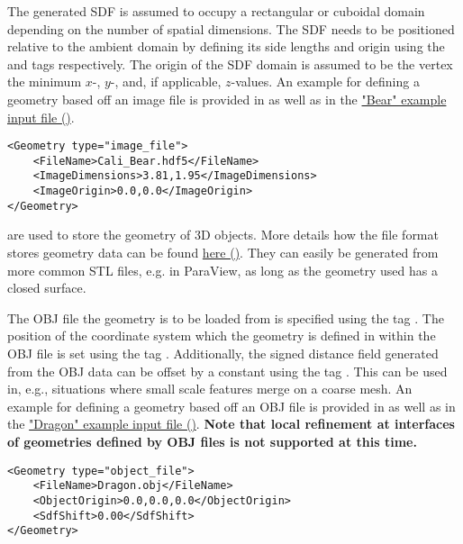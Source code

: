 The generated SDF is assumed to occupy a rectangular or cuboidal domain depending on the number of spatial dimensions. The SDF needs to be positioned relative to the ambient domain by defining its side lengths and origin using the  and  tags respectively. The origin of the SDF domain is assumed to be the vertex the minimum $x$-, $y$-, and, if applicable, $z$-values. An example for defining a geometry based off an image file is provided in  as well as in the \href{https://github.com/kkmaute/moris/blob/main/share/doc/mesh_generation/examples/Bear_Example.xml}{"Bear" example input file (\ExternalLink)}.

\begin{minipage}{\linewidth}
\vspace{0.5cm}
\begin{lstlisting}[caption={Example parameters for an image file as provided in one of the examples.},captionpos=b, label={lst:image}]
<Geometry type="image_file"> 
    <FileName>Cali_Bear.hdf5</FileName>
    <ImageDimensions>3.81,1.95</ImageDimensions>
    <ImageOrigin>0.0,0.0</ImageOrigin>
</Geometry>
\end{lstlisting}
\end{minipage}

 are used to store the geometry of 3D objects.
More details how the file format stores geometry data can be found \href{https://en.wikipedia.org/wiki/Wavefront_.obj_file}{here (\ExternalLink)}. They can easily be generated from more common STL files, e.g. in ParaView, as long as the geometry used has a closed surface.

The OBJ file the geometry is to be loaded from is specified using the tag . The position of the coordinate system which the geometry is defined in within the OBJ file is set using the tag . Additionally, the signed distance field generated from the OBJ data can be offset by a constant using the tag . This can be used in, e.g., situations where small scale features merge on a coarse mesh.
An example for defining a geometry based off an OBJ file is provided in  as well as in the \href{https://github.com/kkmaute/moris/blob/main/share/doc/mesh_generation/examples/Dragon_Example.xml}{"Dragon" example input file (\ExternalLink)}. \textbf{Note that local refinement at interfaces of geometries defined by OBJ files is not supported at this time.}

\begin{minipage}{\linewidth}
\vspace{0.5cm}
\begin{lstlisting}[caption={Example parameters for an OBJ file as provided in one of the examples.},captionpos=b, label={lst:object}]
<Geometry type="object_file">
    <FileName>Dragon.obj</FileName>
    <ObjectOrigin>0.0,0.0,0.0</ObjectOrigin>
    <SdfShift>0.00</SdfShift>
</Geometry>
\end{lstlisting}
\end{minipage}

